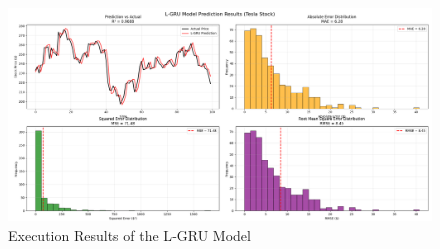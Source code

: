 \documentclass{cys}
\begin{document}
\begin{enumerate}
    \begin{figure}[h!]
        \centering
        \includegraphics[width=\textwidth]{Figure/Figure_1.png}
        \caption{Execution Results of the L‑GRU Model}
        \label{fig:execution}
    \end{figure}


\end{enumerate}
\end{document}

